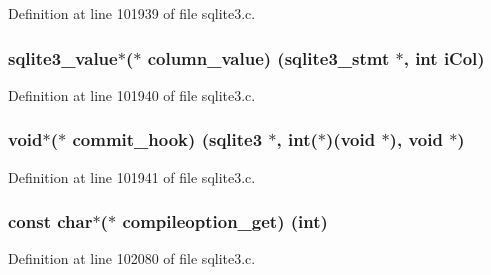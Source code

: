 Definition at line 101939 of file sqlite3.\+c.

\hypertarget{structsqlite3__api__routines_aefb5910a72db46607d30a1d7d8e1545a}{}
\subsubsection[{column\+\_\+value}]{\setlength{\rightskip}{0pt plus 5cm}sqlite3\+\_\+value$\ast$($\ast$ column\+\_\+value) ({\bf sqlite3\+\_\+stmt} $\ast$, int i\+Col)}\label{structsqlite3__api__routines_aefb5910a72db46607d30a1d7d8e1545a}


Definition at line 101940 of file sqlite3.\+c.

\hypertarget{structsqlite3__api__routines_aeaaa1a1102ac1a488fff8dab42260993}{}
\subsubsection[{commit\+\_\+hook}]{\setlength{\rightskip}{0pt plus 5cm}void$\ast$($\ast$ commit\+\_\+hook) ({\bf sqlite3} $\ast$, int($\ast$)(void $\ast$), void $\ast$)}\label{structsqlite3__api__routines_aeaaa1a1102ac1a488fff8dab42260993}


Definition at line 101941 of file sqlite3.\+c.

\hypertarget{structsqlite3__api__routines_a860fe638b621444281202e3ded4fcd80}{}
\subsubsection[{compileoption\+\_\+get}]{\setlength{\rightskip}{0pt plus 5cm}const char$\ast$($\ast$ compileoption\+\_\+get) (int)}\label{structsqlite3__api__routines_a860fe638b621444281202e3ded4fcd80}


Definition at line 102080 of file sqlite3.\+c.

\hypertarget{structsqlite3__api__routines_ae4519132382d8a2a96ff7fb756404e47}{}
